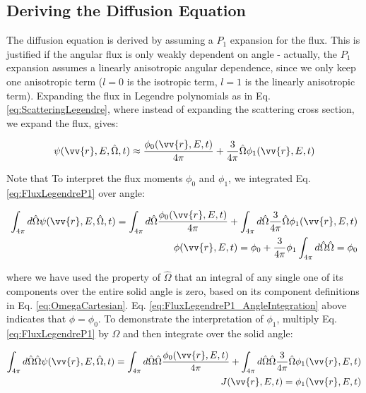 \documentclass[10pt]{article}
\begin{document}
\begin{flushleft}
\section{Deriving the Diffusion Equation}

The diffusion equation is derived by assuming a \(P_1\) expansion for the flux. This is justified if the angular flux is only weakly dependent on angle - actually, the \(P_1\) expansion assumes a linearly anisotropic angular dependence, since we only keep one anisotropic term (\(l=0\) is the isotropic term, \(l=1\) is the linearly anisotropic term). Expanding the flux in Legendre polynomials as in Eq. \ref{eq:ScatteringLegendre}, where instead of expanding the scattering cross section, we expand the flux, gives:

\begin{equation}
\label{eq:FluxLegendreP1}
\psi(\vv{r}, E, \hat{\Omega}, t) \approx \frac{\phi_0(\vv{r}, E, t)}{4\pi} + \frac{3}{4\pi} \hat{\Omega}\phi_1(\vv{r}, E, t)
\end{equation}

Note that To interpret the flux moments \(\phi_0\) and \(\phi_1\), we integrated Eq. \ref{eq:FluxLegendreP1} over angle:

\begin{equation}
\label{eq:FluxLegendreP1_AngleIntegration}
\begin{aligned}
\int_{4\pi}^{} d\hat{\Omega} \psi(\vv{r}, E, \hat{\Omega}, t) = \int_{4\pi}^{} d\hat{\Omega} \frac{\phi_0(\vv{r}, E, t)}{4\pi} + \int_{4\pi}^{} d\hat{\Omega} \frac{3}{4\pi} \hat{\Omega}\phi_1(\vv{r}, E, t)\\
\phi(\vv{r}, E, t) = \phi_0 + \frac{3}{4\pi}\phi_1\int_{4\pi}^{} d\hat{\Omega}\hat{\Omega} = \phi_0
\end{aligned}
\end{equation}

where we have used the property of \(\hat{\Omega}\) that an integral of any single one of its components over the entire solid angle is zero, based on its component definitions in Eq. \ref{eq:OmegaCartesian}. Eq. \ref{eq:FluxLegendreP1_AngleIntegration} above indicates that \(\phi = \phi_0\). To demonstrate the interpretation of \(\phi_1\), multiply Eq. \ref{eq:FluxLegendreP1} by \(\hat{\Omega}\) and then integrate over the solid angle:

\begin{equation}
\label{eq:FluxLegendreP1_AngleIntegration2}
\begin{aligned}
\int_{4\pi}^{} d\hat{\Omega} \hat{\Omega}\psi(\vv{r}, E, \hat{\Omega}, t) = \int_{4\pi}^{} d\hat{\Omega} \hat{\Omega}\frac{\phi_0(\vv{r}, E, t)}{4\pi} + \int_{4\pi}^{} d\hat{\Omega} \hat{\Omega}\frac{3}{4\pi} \hat{\Omega}\phi_1(\vv{r}, E, t)\\
J(\vv{r}, E, t) = \phi_1(\vv{r}, E, t)\\
\end{aligned}
\end{equation}


\end{flushleft}
\end{document}
